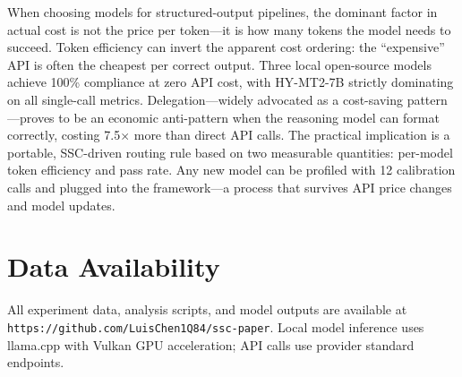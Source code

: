 \documentclass[11pt,a4paper]{article}
\begin{document}
When choosing models for structured-output pipelines, the dominant factor in actual cost is not the price per token---it is how many tokens the model needs to succeed. Token efficiency can invert the apparent cost ordering: the ``expensive'' API is often the cheapest per correct output. Three local open-source models achieve 100\% compliance at zero API cost, with HY-MT2-7B strictly dominating on all single-call metrics. Delegation---widely advocated as a cost-saving pattern---proves to be an economic anti-pattern when the reasoning model can format correctly, costing 7.5$\times$ more than direct API calls. The practical implication is a portable, SSC-driven routing rule based on two measurable quantities: per-model token efficiency and pass rate. Any new model can be profiled with 12 calibration calls and plugged into the framework---a process that survives API price changes and model updates.

\section*{Data Availability}

All experiment data, analysis scripts, and model outputs are available at \texttt{https://github.com/LuisChen1Q84/ssc-paper}. Local model inference uses llama.cpp with Vulkan GPU acceleration; API calls use provider standard endpoints.
\end{document}
